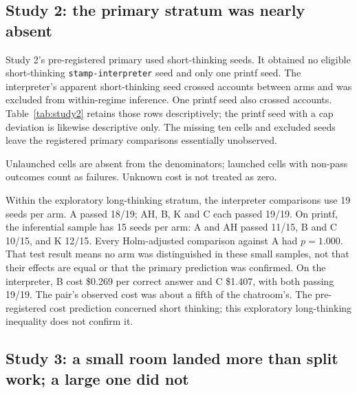 \subsection{Study 2: the primary stratum was nearly absent}
\label{sec:results-study2}

Study 2's pre-registered primary used short-thinking seeds. It obtained no eligible short-thinking \texttt{stamp-interpreter} seed and only one printf seed. The interpreter's apparent short-thinking seed crossed accounts between arms and was excluded from within-regime inference. One printf seed also crossed accounts. Table~\ref{tab:study2} retains those rows descriptively; the printf seed with a cap deviation is likewise descriptive only. The missing ten cells and excluded seeds leave the registered primary comparisons essentially unobserved.


Unlaunched cells are absent from the denominators; launched cells with non-pass outcomes count as failures. Unknown cost is not treated as zero.

\begin{table}[t]
\centering
\caption{Study 2 descriptive outcomes by task, stratum and arm. Inference excludes mixed-account seeds and printf seed 501; the eligible long-thinking comparisons use fewer seeds than some descriptive rows.}
\label{tab:study2}
\resizebox{\linewidth}{!}{}
\end{table}

Within the exploratory long-thinking stratum, the interpreter comparisons use 19 seeds per arm. A passed 18/19; AH, B, K and C each passed 19/19. On printf, the inferential sample has 15 seeds per arm: A and AH passed 11/15, B and C 10/15, and K 12/15. Every Holm-adjusted comparison against A had $p=1.000$. That test result means no arm was distinguished in these small samples, not that their effects are equal or that the primary prediction was confirmed. On the interpreter, B cost \$0.269 per correct answer and C \$1.407, with both passing 19/19. The pair's observed cost was about a fifth of the chatroom's. The pre-registered cost prediction concerned short thinking; this exploratory long-thinking inequality does not confirm it.

\subsection{Study 3: a small room landed more than split work; a large one did not}
\label{sec:results-study3}

